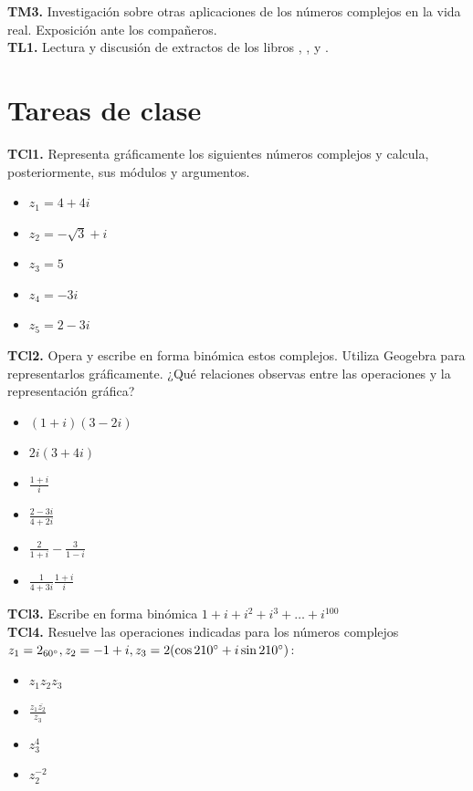 \documentclass[../main.tex]{memoir}
\begin{document}
\textbf{TM3.} Investigación sobre otras aplicaciones de los números complejos en la vida real. Exposición ante los compañeros. \\

\textbf{TL1.} Lectura y discusión de extractos de los libros \cite{argand1971}, \cite{nahin1998}, \cite{blank1999} y \cite{descartes1952}.

\section{Tareas de clase}

\textbf{TCl1.} Representa gráficamente los siguientes números complejos y calcula, posteriormente, sus módulos y argumentos.

\begin{itemize}
	\item $z_1 = 4+4i$
	\item $z_2 = -\sqrt{3}+i$
	\item $z_3=5$
	\item $z_4=-3i$
	\item $z_5 = 2-3i$
\end{itemize}

\textbf{TCl2.} Opera y escribe en forma binómica estos complejos. Utiliza Geogebra para representarlos gráficamente. ¿Qué relaciones observas entre las operaciones y la representación gráfica?

\begin{itemize}
	\item $(1+i)(3-2i)$
	\item $2i (3+4i)$
	\item $\displaystyle\frac{1+i}{i}$
	\item $\displaystyle \frac{2-3i}{4+2i}$
	\item $\displaystyle \frac{2}{1+i} - \frac{3}{1-i}$
	\item $\displaystyle \frac{1}{4+3i} \frac{1+i}{i}$
\end{itemize}

\textbf{TCl3.} Escribe en forma binómica $1+i+i^2+i^3+\dots+i^{100}$ \\


\textbf{TCl4.} Resuelve las operaciones indicadas para los números complejos $z_1=2_{60\degree}, z_2=-1+i, z_3  = 2(\cos 210\degree +i \sin 210\degree)$:
\begin{itemize}
	\item $z_1 z_2 z_3$
	\item $\displaystyle \frac{z_1 \overline{z_2}}{z_3}$
	\item $z_3^4$
	\item $z_2^{-2}$
\end{itemize}
\end{document}
